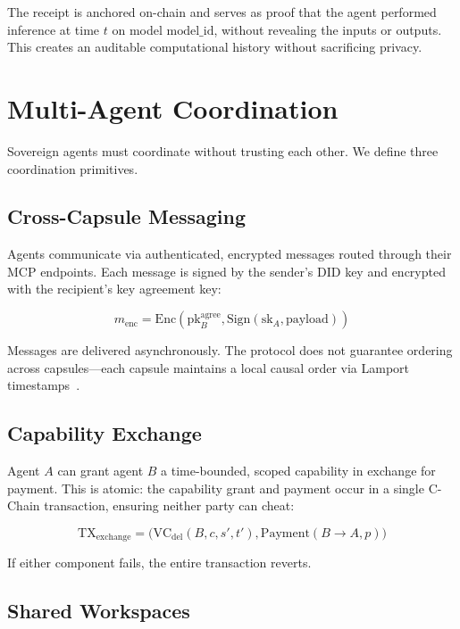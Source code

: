 \documentclass[11pt,a4paper]{article}
\begin{document}
The receipt is anchored on-chain and serves as proof that the agent performed inference at time $t$ on model $\text{model\_id}$, without revealing the inputs or outputs. This creates an auditable computational history without sacrificing privacy.

\section{Multi-Agent Coordination}\label{sec:coordination}

Sovereign agents must coordinate without trusting each other. We define three coordination primitives.

\subsection{Cross-Capsule Messaging}

Agents communicate via authenticated, encrypted messages routed through their MCP endpoints. Each message is signed by the sender's DID key and encrypted with the recipient's key agreement key:

\begin{equation}\label{eq:message}
    m_{\text{enc}} = \text{Enc}(\text{pk}_B^{\text{agree}}, \text{Sign}(\text{sk}_A, \text{payload}))
\end{equation}

Messages are delivered asynchronously. The protocol does not guarantee ordering across capsules---each capsule maintains a local causal order via Lamport timestamps~\cite{lamport1978clocks}.

\subsection{Capability Exchange}

Agent $A$ can grant agent $B$ a time-bounded, scoped capability in exchange for payment. This is atomic: the capability grant and payment occur in a single C-Chain transaction, ensuring neither party can cheat:

\begin{equation}\label{eq:exchange}
    \text{TX}_{\text{exchange}} = \big(\text{VC}_{\text{del}}(B, c, s', t'), \text{Payment}(B \to A, p)\big)
\end{equation}

If either component fails, the entire transaction reverts.

\subsection{Shared Workspaces}
\end{document}
